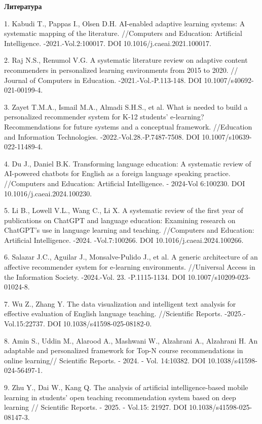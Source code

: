 \begin{center}
{\bfseries Литература}
\end{center}

\begin{refs}
1. Kabudi T., Pappas I., Olsen D.H. AI-enabled adaptive learning
systems: A systematic mapping of the literature. //Computers and
Education: Artificial Intelligence. -2021.-Vol.2:100017. DOI
10.1016/j.caeai.2021.100017.

2. Raj N.S., Renumol V.G. A systematic literature review on adaptive
content recommenders in personalized learning environments from 2015 to
2020. // Journal of Computers in Education. -2021.-Vol.-P.113-148. DOI
10.1007/s40692-021-00199-4.

3. Zayet T.M.A., Ismail M.A., Almadi S.H.S., et al. What is needed to
build a personalized recommender system for K-12 students' e-learning?
Recommendations for future systems and a conceptual framework.
//Education and Information Technologies. -2022.-Vol.28.-P.7487-7508.
DOI 10.1007/s10639-022-11489-4.

4. Du J., Daniel B.K. Transforming language education: A systematic
review of AI-powered chatbots for English as a foreign language speaking
practice. //Computers and Education: Artificial Intelligence. - 2024-Vol
6:100230. DOI 10.1016/j.caeai.2024.100230.

5. Li B., Lowell V.L., Wang C., Li X. A systematic review of the first
year of publications on ChatGPT and language education: Examining
research on ChatGPT's use in language learning and teaching. //Computers
and Education: Artificial Intelligence. -2024. -Vol.7:100266. DOI
10.1016/j.caeai.2024.100266.

6. Salazar J.C., Aguilar J., Monsalve-Pulido J., et al. A generic
architecture of an affective recommender system for e-learning
environments. //Universal Access in the Information Society. -2024.-Vol.
23. -P.1115-1134. DOI 10.1007/s10209-023-01024-8.

7. Wu Z., Zhang Y. The data visualization and intelligent text analysis
for effective evaluation of English language teaching. //Scientific
Reports. -2025.-Vol.15:22737. DOI 10.1038/s41598-025-08182-0.

8. Amin S., Uddin M., Alarood A., Mashwani W., Alzahrani A., Alzahrani
H. An adaptable and personalized framework for Top-N course
recommendations in online learning// Scientific Reports. - 2024. - Vol.
14:10382. DOI 10.1038/s41598-024-56497-1.

9. Zhu Y., Dai W., Kang Q. The analysis of artificial intelligence-based
mobile learning in students'{} open teaching
recommendation system based on deep learning // Scientific Reports. -
2025. - Vol.15: 21927. DOI 10.1038/s41598-025-08147-3.


\end{refs}
